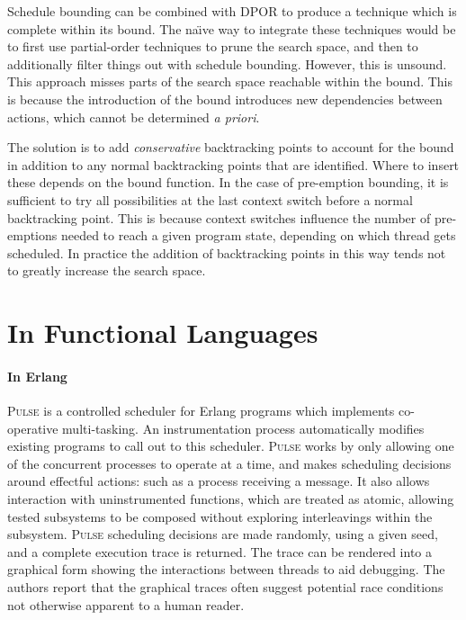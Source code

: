 Schedule bounding can be combined with DPOR to produce a technique which is
complete within its bound.  The na\"{\i}ve way to integrate these techniques
would be to first use partial-order techniques to prune the search space, and
then to additionally filter things out with schedule bounding.  However, this is
unsound.  This approach misses parts of the search space reachable within the
bound.  This is because the introduction of the bound introduces new
dependencies between actions, which cannot be determined \emph{a
  priori}\cite{coons2013}.

The solution is to add \emph{conservative} backtracking points to
account for the bound in addition to any normal backtracking points
that are identified.  Where to insert these depends on the bound
function.  In the case of pre-emption bounding, it is sufficient to
try all possibilities at the last context switch before a normal
backtracking point\cite{coons2013}.  This is because context switches
influence the number of pre-emptions needed to reach a given program
state, depending on which thread gets scheduled.  In practice the
addition of backtracking points in this way tends not to greatly
increase the search space\cite{coons2013}.

\section{In Functional Languages}
\label{sec:sct-functional}

\paragraph{In Erlang}
\textsc{Pulse}\cite{claessen2009} is a controlled scheduler for Erlang
programs which implements co-operative multi-tasking.  An
instrumentation process automatically modifies existing programs to
call out to this scheduler.  \textsc{Pulse} works by only allowing one
of the concurrent processes to operate at a time, and makes scheduling
decisions around effectful actions: such as a process receiving a
message.  It also allows interaction with uninstrumented functions,
which are treated as atomic, allowing tested subsystems to be composed
without exploring interleavings within the subsystem.  \textsc{Pulse}
scheduling decisions are made randomly, using a given seed, and a
complete execution trace is returned.  The trace can be rendered into
a graphical form showing the interactions between threads to aid
debugging.  The authors report that the graphical traces often suggest
potential race conditions not otherwise apparent to a human reader.

